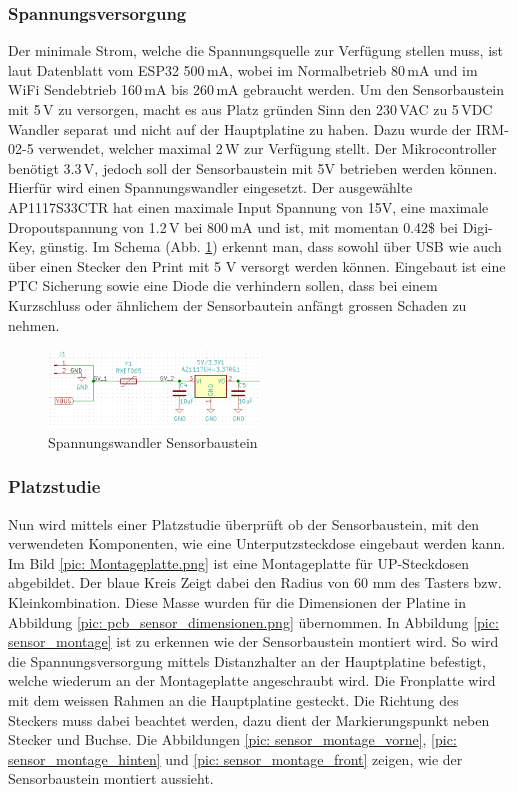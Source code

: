 \subsubsection{Spannungsversorgung}
Der minimale Strom, welche die Spannungsquelle zur Verfügung stellen muss, ist laut Datenblatt vom ESP32 500\,mA, wobei im Normalbetrieb 80\,mA und im WiFi Sendebtrieb 160\,mA bis 260\,mA gebraucht werden.
Um den Sensorbaustein mit 5\,V zu versorgen, macht es aus Platz gründen Sinn den 230\,VAC zu 5\,VDC Wandler separat und nicht auf der Hauptplatine zu haben. Dazu wurde der IRM-02-5 verwendet, welcher maximal 2\,W zur Verfügung stellt. Der Mikrocontroller benötigt 3.3\,V, jedoch soll der Sensorbaustein mit 5V betrieben werden können. Hierfür wird einen Spannungswandler eingesetzt. Der ausgewählte AP1117S33CTR hat einen maximale Input Spannung von 15V, eine maximale Dropoutspannung von 1.2\,V bei 800\,mA und ist, mit momentan 0.42\$  bei Digi-Key, günstig. Im Schema (Abb. \ref{pic: Wandler_Sensor}) erkennt man, dass sowohl über USB wie auch über einen Stecker den Print mit 5 V versorgt werden können. Eingebaut ist eine PTC Sicherung sowie eine Diode die verhindern sollen, dass bei einem Kurzschluss oder ähnlichem der Sensorbautein anfängt grossen Schaden zu nehmen.

\begin{figure}[h!]
	\centering
	\includegraphics[width=0.5\textwidth]{graphics/shematics_sensor_33V.png}
	\caption{Spannungswandler Sensorbaustein}
	\label{pic: Wandler_Sensor}
\end{figure}

\subsubsection{Platzstudie}
Nun wird mittels einer Platzstudie überprüft ob der Sensorbaustein, mit den verwendeten Komponenten, wie eine Unterputzsteckdose eingebaut werden kann.
Im Bild \ref{pic: Montageplatte.png} ist eine Montageplatte für UP-Steckdosen abgebildet. Der blaue Kreis Zeigt dabei den Radius von 60 mm des Tasters bzw. Kleinkombination. Diese Masse wurden für die Dimensionen der Platine in Abbildung \ref{pic: pcb_sensor_dimensionen.png} übernommen. In Abbildung \ref{pic: sensor_montage} ist zu erkennen wie der Sensorbaustein montiert wird. So wird die Spannungsversorgung mittels Distanzhalter an der Hauptplatine befestigt, welche wiederum an der Montageplatte angeschraubt wird. Die Fronplatte wird mit dem weissen Rahmen an die Hauptplatine gesteckt. Die Richtung des Steckers muss dabei beachtet werden, dazu dient der Markierungspunkt neben Stecker und Buchse. Die Abbildungen  \ref{pic: sensor_montage_vorne}, \ref{pic: sensor_montage_hinten} und \ref{pic: sensor_montage_front} zeigen, wie der Sensorbaustein montiert aussieht.

